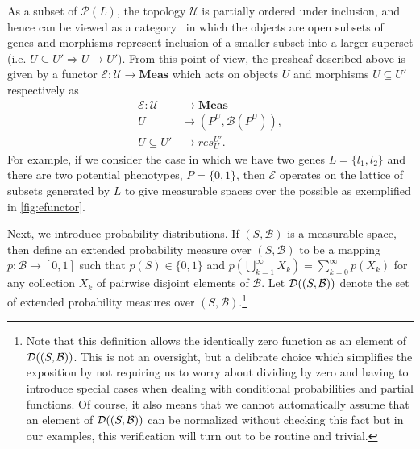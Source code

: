 As a subset of $\mathcal{P}(L)$, the topology $\mathcal{U}$ is partially ordered under inclusion, and hence can be viewed as a category~\cite{Lane1998,MacLane1992,Awodey2006} in which the objects are open subsets of genes and morphisms represent inclusion of a smaller subset into a larger superset (i.e. $U \subseteq U' \Rightarrow U \rightarrow U'$).  From this point of view, the presheaf described above is given by a functor $\mathcal{E} \colon \mathcal{U} \rightarrow \mathbf{Meas}$ which acts on objects $U$ and morphisms $U \subseteq U'$ respectively as
\begin{equation}\label{eq:gpfunctor}
\begin{split}
\mathcal{E} \colon \mathcal{U} &\rightarrow \mathbf{Meas}\\
U &\mapsto (P^U, \mathcal{B}(P^U)),\\
U \subseteq U' &\mapsto res^{U'}_{U}.
\end{split}
\end{equation}
For example, if we consider the case in which we have two genes $L=\{l_1,l_2\}$ and there are two potential phenotypes, $P=\{0,1\}$, then $\mathcal{E}$ operates on the lattice of subsets generated by $L$ to give measurable spaces over the possible \gnpm{} as exemplified in \ref{fig:efunctor}.

Next, we introduce probability distributions.  If $(S,\mathcal{B})$ is a measurable space, then define an extended probability measure over $(S,\mathcal{B})$ to be a mapping $p \colon \mathcal{B} \to [0,1]$ such that $p(S) \in \{0,1\}$ and $p(\bigcup_{k=1}^\infty X_k) = \sum_{k=0}^\infty p(X_k)$ for any collection $X_k$ of pairwise disjoint elements of $\mathcal{B}$.  Let $\mathcal{D}((S,\mathcal{B}))$ denote the set of extended probability measures over $(S,\mathcal{B})$.\footnote{Note that this definition allows the identically zero function as an element of $\mathcal{D}((S,\mathcal{B}))$.  This is not an oversight, but a delibrate choice which simplifies the exposition by not requiring us to worry about dividing by zero and having to introduce special cases when dealing with conditional probabilities and partial functions.  Of course, it also means that we cannot automatically assume that an element of $\mathcal{D}((S,\mathcal{B}))$ can be normalized without checking this fact but in our examples, this verification will turn out to be routine and trivial.}

